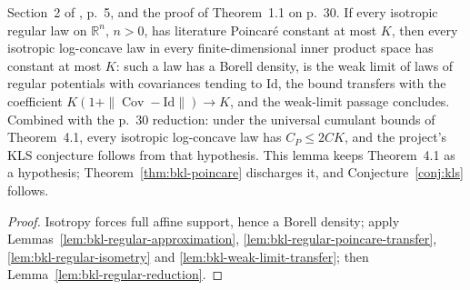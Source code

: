\begin{lemma}
  \label{lem:bkl-isotropic-reduction}
  \leanok
  Section~2 of \cite{BizeulKlartagLehec2026}, p.~5, and the proof of Theorem~1.1 on p.~30. If every
  isotropic regular law on $\mathbb R^n$, $n>0$, has literature Poincaré constant at most $K$, then
  every isotropic log-concave law in every finite-dimensional inner product space has constant at
  most $K$: such a law has a Borell density, is the weak limit of laws of regular potentials with
  covariances tending to $\mathrm{Id}$, the bound transfers with the coefficient
  $K(1+\|\operatorname{Cov}-\mathrm{Id}\|)\to K$, and the weak-limit passage concludes. Combined with
  the p.~30 reduction: under the universal cumulant bounds of Theorem~4.1, every isotropic
  log-concave law has $C_P\le2CK$, and the project's KLS conjecture follows from that hypothesis.
  This lemma keeps Theorem~4.1 as a hypothesis; Theorem~\ref{thm:bkl-poincare} discharges it, and
  Conjecture~\ref{conj:kls} follows.
\end{lemma}
\begin{proof}
  \leanok
  Isotropy forces full affine support, hence a Borell density; apply
  Lemmas~\ref{lem:bkl-regular-approximation}, \ref{lem:bkl-regular-poincare-transfer},
  \ref{lem:bkl-regular-isometry} and \ref{lem:bkl-weak-limit-transfer}; then
  Lemma~\ref{lem:bkl-regular-reduction}.
\end{proof}

